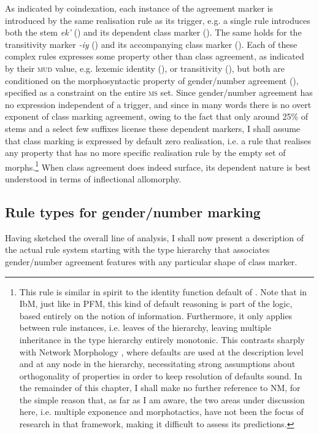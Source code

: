 \documentclass[output=paper]{langsci/langscibook}
\begin{document}
As indicated by coindexation, each instance of the agreement marker is
introduced by the same realisation rule as its trigger, e.g. a single
rule introduces both the stem \textit{ek'} () and its
dependent class marker (). The same holds for the
transitivity marker \textit{-iy} () and its accompanying
class marker (). Each of these complex rules expresses some
property other than class agreement, as indicated by their
\textsc{mud} value, e.g. lexemic identity (), or
transitivity (), but both are conditioned on the
morphosyntactic property of gender/number agreement (),
specified as a constraint on the entire \textsc{ms} set. Since
gender/number agreement has no expression independent of a trigger,
and since in many words there is no overt exponent of class marking
agreement, owing to the fact that only around 25\% of stems and a
select few suffixes license these dependent markers, I shall assume
that class marking is expressed by default zero realisation, i.e. a
rule that realises any property that has no more specific realisation
rule by the empty set of morphs.\footnote{This rule is similar in
  spirit to the identity function default of \citet{Stump01}. Note
  that in IbM, just like in PFM, this kind of default reasoning is
  part of the logic, based entirely on the notion of
  information. Furthermore, it only applies between rule instances,
  i.e. leaves of the hierarchy, leaving multiple inheritance in the
  type hierarchy entirely monotonic. This contrasts sharply with
  Network Morphology \citep[=NM][]{Brown11}, where defaults are used
  at the description level and at any node in the hierarchy,
  necessitating strong assumptions about orthogonality of properties
  in order to keep resolution of defaults sound. In the remainder of
  this chapter, I shall make no further reference to NM, for the
  simple reason that, as far as I am aware, the two areas under
  discussion here, i.e. multiple exponence and morphotactics, have not
  been the focus of research in that framework, making
  it difficult to assess its predictions. } When class agreement does
indeed surface, its dependent nature is best understood in terms of
inflectional allomorphy.

\subsection{Rule types for gender/number marking}

Having sketched the overall line of analysis,  
I shall now present a  description of the actual rule system starting
with the type hierarchy that associates gender/number agreement features with
any particular shape of class marker.  
\end{document}
